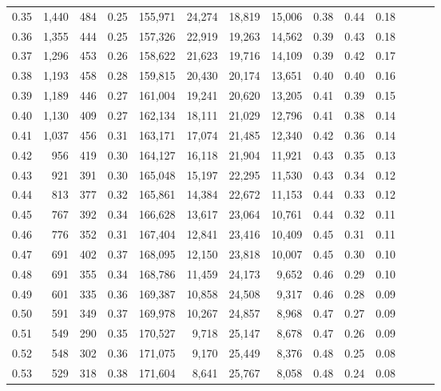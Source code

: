 \begin{tabular}{rrrrrrrrrrrrrr}
0.35 &  1,440 &  484 &  0.25 &  155,971 &   24,274 &  18,819 &  15,006 &  0.38 &  0.44 &      0.18 \\
0.36 &  1,355 &  444 &  0.25 &  157,326 &   22,919 &  19,263 &  14,562 &  0.39 &  0.43 &      0.18 \\
0.37 &  1,296 &  453 &  0.26 &  158,622 &   21,623 &  19,716 &  14,109 &  0.39 &  0.42 &      0.17 \\
0.38 &  1,193 &  458 &  0.28 &  159,815 &   20,430 &  20,174 &  13,651 &  0.40 &  0.40 &      0.16 \\
0.39 &  1,189 &  446 &  0.27 &  161,004 &   19,241 &  20,620 &  13,205 &  0.41 &  0.39 &      0.15 \\
0.40 &  1,130 &  409 &  0.27 &  162,134 &   18,111 &  21,029 &  12,796 &  0.41 &  0.38 &      0.14 \\
0.41 &  1,037 &  456 &  0.31 &  163,171 &   17,074 &  21,485 &  12,340 &  0.42 &  0.36 &      0.14 \\
0.42 &    956 &  419 &  0.30 &  164,127 &   16,118 &  21,904 &  11,921 &  0.43 &  0.35 &      0.13 \\
0.43 &    921 &  391 &  0.30 &  165,048 &   15,197 &  22,295 &  11,530 &  0.43 &  0.34 &      0.12 \\
0.44 &    813 &  377 &  0.32 &  165,861 &   14,384 &  22,672 &  11,153 &  0.44 &  0.33 &      0.12 \\
0.45 &    767 &  392 &  0.34 &  166,628 &   13,617 &  23,064 &  10,761 &  0.44 &  0.32 &      0.11 \\
0.46 &    776 &  352 &  0.31 &  167,404 &   12,841 &  23,416 &  10,409 &  0.45 &  0.31 &      0.11 \\
0.47 &    691 &  402 &  0.37 &  168,095 &   12,150 &  23,818 &  10,007 &  0.45 &  0.30 &      0.10 \\
0.48 &    691 &  355 &  0.34 &  168,786 &   11,459 &  24,173 &   9,652 &  0.46 &  0.29 &      0.10 \\
0.49 &    601 &  335 &  0.36 &  169,387 &   10,858 &  24,508 &   9,317 &  0.46 &  0.28 &      0.09 \\
0.50 &    591 &  349 &  0.37 &  169,978 &   10,267 &  24,857 &   8,968 &  0.47 &  0.27 &      0.09 \\
0.51 &    549 &  290 &  0.35 &  170,527 &    9,718 &  25,147 &   8,678 &  0.47 &  0.26 &      0.09 \\
0.52 &    548 &  302 &  0.36 &  171,075 &    9,170 &  25,449 &   8,376 &  0.48 &  0.25 &      0.08 \\
0.53 &    529 &  318 &  0.38 &  171,604 &    8,641 &  25,767 &   8,058 &  0.48 &  0.24 &      0.08 \\

\end{tabular}
